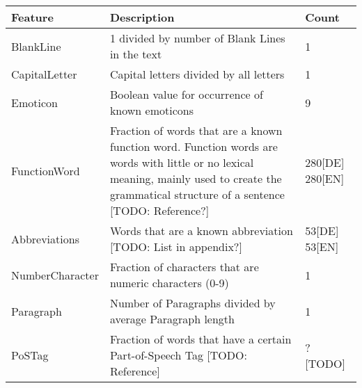 \begin{table}[h]
    \begin{center}
    \begin{tabular}{p{2.6cm}|p{8.2cm}|p{1.2cm}}
    Feature              & Description                                                                                                                                                                                    & Count             \\ \hline
    BlankLine            & 1 divided by number of Blank Lines in the text                                                                                                                                     & 1                 \\ \hline
    CapitalLetter        & Capital letters divided by all letters                                                                                                                                             & 1                 \\ \hline
    Emoticon             & Boolean value for occurrence of known emoticons                                                                                                                                                & 9                 \\ \hline
    FunctionWord         & Fraction of words that are a known function word. Function words are words with little or no lexical meaning, mainly used to create the grammatical structure of a sentence [TODO: Reference?] & 280[DE] 280[EN] \\ \hline
    Abbreviations        & Words that are a known abbreviation [TODO: List in appendix?]                                                                                                                      & 53[DE] 53[EN]   \\ \hline
    NumberCharacter      & Fraction of characters that are numeric characters (0-9)                                                                                                                                       & 1                 \\ \hline
    Paragraph            & Number of Paragraphs divided by average Paragraph length                                                                                                                           & 1                 \\ \hline
    PoSTag               & Fraction of words that have a certain Part-of-Speech Tag [TODO: Reference]                                                                                                                     & ? [TODO]          \\ \hline

\end{tabular}
\end{center}
\end{table}
